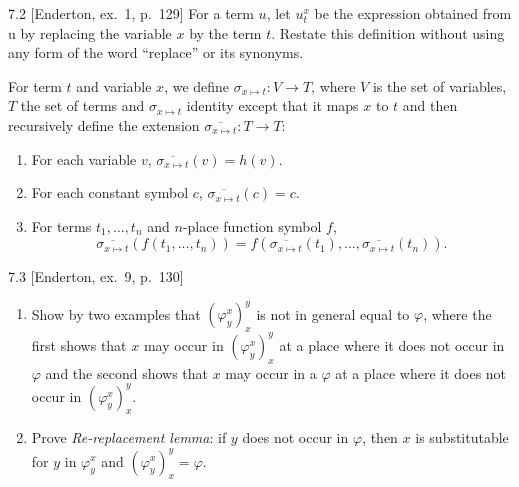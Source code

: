 \begin{exercise}{7.2}
  [Enderton, ex.~1, p.~129]
  For a term $u$, let $u_t^x$ be the expression obtained from u by replacing the variable $x$ by the term $t$. Restate this definition without using any form of the word “replace” or its synonyms.
\end{exercise}

For term $t$ and variable $x$, we define $\sigma_{x\mapsto t}:V\rightarrow T$, where $V$ is the set of variables, $T$ the set of terms and $\sigma_{x\mapsto t}$ identity except that it maps $x$ to $t$ and then recursively define the extension $\overline{\sigma_{x\mapsto t}}:T\rightarrow T$:
\begin{enumerate}
  \item For each variable $v$, $\overline{\sigma_{x\mapsto t}}(v)=h(v)$.
  \item For each constant symbol $c$, $\overline{\sigma_{x\mapsto t}}(c)=c$.
  \item For terms $t_1,\dots,t_n$ and $n$-place function symbol $f$,
        \[\overline{\sigma_{x\mapsto t}}(f(t_1,\dots,t_n))=f(\overline{\sigma_{x\mapsto t}}(t_1),\dots,\overline{\sigma_{x\mapsto t}}(t_n)).\]
\end{enumerate}

\begin{exercise}{7.3}
  [Enderton, ex.~9, p.~130]
  \begin{enumerate}[label=(\alph*)]
    \item Show by two examples that $(\varphi_y^x)_x^y$ is not in general equal to $\varphi$, where the first shows that $x$ may occur in $(\varphi_y^x)_x^y$ at a place where it does not occur in $\varphi$ and the second shows that $x$ may occur in a $\varphi$ at a place where it does not occur in $(\varphi_y^x)_x^y$.
    \item Prove \textit{Re-replacement lemma}: if $y$ does not occur in $\varphi$, then $x$ is substitutable for $y$ in $\varphi_y^x$ and $(\varphi_y^x)_x^y=\varphi$.\qedhere
  \end{enumerate}
\end{exercise}

